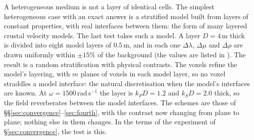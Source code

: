 \documentclass[preprint,review,12pt]{elsarticle}
\begin{document}
A heterogeneous medium is not a layer of identical cells. The simplest heterogeneous case with an
exact answer is a stratified model built from layers of constant properties, with real interfaces
between them: the form of many layered crustal velocity models. The last test takes such a model. A
layer $D=4$\,m thick is divided into eight model layers of $0.5$\,m, and in each one $\Delta\lambda$, $\Delta\mu$
and $\Delta\rho$ are drawn uniformly within $\pm15\%$ of the background (the values are listed in
). The result is a random stratification with physical contrasts. The voxels refine
the model's layering, with $m$ planes of voxels in each model layer, so no voxel straddles a model
interface: the natural discretisation when the model's interfaces are known. At $\omega=1500$\,rad\,s$^{-1}$ the layer is
$k_PD=1.2$ and $k_SD=2.0$ thick, so the field reverberates between the model interfaces. The schemes are those of \S\S\ref{sec:convergence}--\ref{sec:fourth}, with the
contrast now changing from plane to plane; nothing else in them changes. In the terms of the
experiment of \S\ref{sec:convergence}, the test is this.
\end{document}
